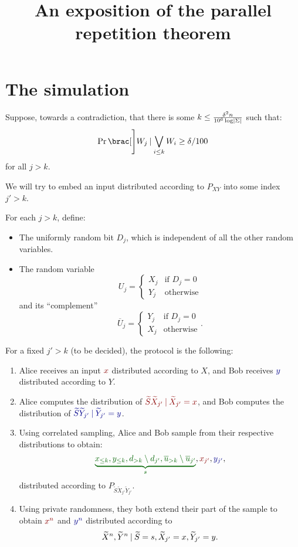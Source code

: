 \documentclass[12pt]{article}
\title{An exposition of the parallel repetition theorem}
\makeatletter
\DeclarePairedDelimiter\card{\lvert}{\rvert}
\providecommand\given{}
\renewcommand\given{\nonscript\: \delimsize\vert{} \nonscript\: \mathopen{}}
\renewcommand\given{\nonscript\: \delimsize\vert{} \nonscript\: \mathopen{}}
\def\mathcolor#1#{\@mathcolor{#1}}
\def\@mathcolor#1#2#3{%
  \protect\leavevmode
  \begingroup
  \color#1{#2}#3%
  \endgroup
}
\newcommand{\OA}[1]{\mathcolor{DarkRed}{#1}}
\newcommand{\OB}[1]{\mathcolor{DarkBlue}{#1}}
\newcommand{\both}[1]{\mathcolor{DarkGreen}{#1}}
\renewcommand\given{ \nonscript\: \vert{} \nonscript\: \mathopen{} }
\newcommand{\St}{\widetilde{S}}
\newcommand{\Xt}{\widetilde{X}}
\newcommand{\Yt}{\widetilde{Y}}
\newcommand{\uo}{\overline{u}}
\makeatother
\begin{document}
\maketitle

\section{The simulation}

Suppose, towards a contradiction, that there is some
$k \leq \frac{\delta^2 n}{{10}^6 \log \card{\Sigma}}$ such that:
\[
\Prob[\Bigg]{ W_j \given \bigvee_{i \leq k} W_i } \geq \delta / 100
\]
for all $j > k$.

We will try to embed an input distributed according to $P_{XY}$ into some
index $j' > k$.

For each $j > k$, define:
\begin{itemize}
  \item The uniformly random bit $D_j$, which is independent of all the other
    random variables.
  \item The random variable
    \[
      U_j = \begin{cases}
        X_j & \text{if } D_j = 0\\
        Y_j & \text{otherwise}
      \end{cases}
    \]
    and its ``complement''
    \[
      \overline{U}_j = \begin{cases}
        Y_j & \text{if } D_j = 0\\
        X_j & \text{otherwise}
      \end{cases}.
    \]
\end{itemize}

For a fixed $j' > k$ (to be decided), the protocol is the following:
\begin{enumerate}
  \item Alice receives an input $\OA{x}$ distributed according to $X$, and Bob
    receives $\OB{y}$ distributed according to $Y$.
  \item Alice computes the distribution of
    $\OA{\St\Xt_{j'} \given \Xt_{j'} = x}$,
    and Bob computes the distribution of
    $\OB{\St\Yt_{j'} \given \Yt_{j'} = y}$.
  \item Using correlated sampling, Alice and Bob sample from their respective
    distributions to obtain:
    \[
      \both{
        \underbrace{
          x_{\leq k}, y_{\leq k}, d_{> k} \setminus d_{j'},
      \uo_{> k} \setminus \uo_{j'}}_{s}},
      \OA{x_{j'}}, \OB{y_{j'}},
    \]
    distributed according to $P_{\St\Xt_{j'}\Yt_{j'}}$.
  \item Using private randomness, they both extend their part of the sample to
    obtain $\OA{x^n}$ and $\OB{y^n}$ distributed according to
    \[
      \Xt^n, \Yt^n \given \St = s, \Xt_{j'} = x, \Yt_{j'} = y.
    \]
\end{enumerate}
\end{document}
